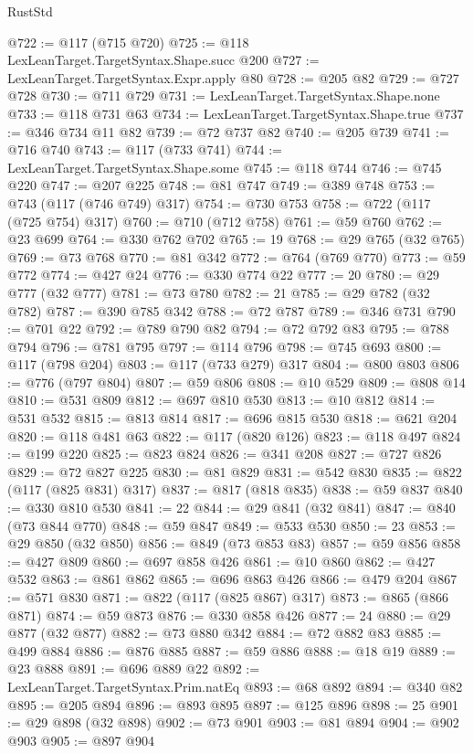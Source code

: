 \begin{lexlean}{RustStd}
\begin{coremodule}
@722 := @117 (@715 @720)
@725 := @118 LexLeanTarget.TargetSyntax.Shape.succ @200
@727 := LexLeanTarget.TargetSyntax.Expr.apply @80
@728 := @205 @82
@729 := @727 @728
@730 := @711 @729
@731 := LexLeanTarget.TargetSyntax.Shape.none
@733 := @118 @731 @63
@734 := LexLeanTarget.TargetSyntax.Shape.true
@737 := @346 @734 @11 @82
@739 := @72 @737 @82
@740 := @205 @739
@741 := @716 @740
@743 := @117 (@733 @741)
@744 := LexLeanTarget.TargetSyntax.Shape.some
@745 := @118 @744
@746 := @745 @220
@747 := @207 @225
@748 := @81 @747
@749 := @389 @748
@753 := @743 (@117 (@746 @749) @317)
@754 := @730 @753
@758 := @722 (@117 (@725 @754) @317)
@760 := @710 (@712 @758)
@761 := @59 @760
@762 := @23 @699
@764 := @330 @762 @702
@765 := 19
@768 := @29 @765 (@32 @765)
@769 := @73 @768
@770 := @81 @342
@772 := @764 (@769 @770)
@773 := @59 @772
@774 := @427 @24
@776 := @330 @774 @22
@777 := 20
@780 := @29 @777 (@32 @777)
@781 := @73 @780
@782 := 21
@785 := @29 @782 (@32 @782)
@787 := @390 @785 @342
@788 := @72 @787
@789 := @346 @731
@790 := @701 @22
@792 := @789 @790 @82
@794 := @72 @792 @83
@795 := @788 @794
@796 := @781 @795
@797 := @114 @796
@798 := @745 @693
@800 := @117 (@798 @204)
@803 := @117 (@733 @279) @317
@804 := @800 @803
@806 := @776 (@797 @804)
@807 := @59 @806
@808 := @10 @529
@809 := @808 @14
@810 := @531 @809
@812 := @697 @810 @530
@813 := @10 @812
@814 := @531 @532
@815 := @813 @814
@817 := @696 @815 @530
@818 := @621 @204
@820 := @118 @481 @63
@822 := @117 (@820 @126)
@823 := @118 @497
@824 := @199 @220
@825 := @823 @824
@826 := @341 @208
@827 := @727 @826
@829 := @72 @827 @225
@830 := @81 @829
@831 := @542 @830
@835 := @822 (@117 (@825 @831) @317)
@837 := @817 (@818 @835)
@838 := @59 @837
@840 := @330 @810 @530
@841 := 22
@844 := @29 @841 (@32 @841)
@847 := @840 (@73 @844 @770)
@848 := @59 @847
@849 := @533 @530
@850 := 23
@853 := @29 @850 (@32 @850)
@856 := @849 (@73 @853 @83)
@857 := @59 @856
@858 := @427 @809
@860 := @697 @858 @426
@861 := @10 @860
@862 := @427 @532
@863 := @861 @862
@865 := @696 @863 @426
@866 := @479 @204
@867 := @571 @830
@871 := @822 (@117 (@825 @867) @317)
@873 := @865 (@866 @871)
@874 := @59 @873
@876 := @330 @858 @426
@877 := 24
@880 := @29 @877 (@32 @877)
@882 := @73 @880 @342
@884 := @72 @882 @83
@885 := @499 @884
@886 := @876 @885
@887 := @59 @886
@888 := @18 @19
@889 := @23 @888
@891 := @696 @889 @22
@892 := LexLeanTarget.TargetSyntax.Prim.natEq
@893 := @68 @892
@894 := @340 @82
@895 := @205 @894
@896 := @893 @895
@897 := @125 @896
@898 := 25
@901 := @29 @898 (@32 @898)
@902 := @73 @901
@903 := @81 @894
@904 := @902 @903
@905 := @897 @904

\end{coremodule}
\end{lexlean}

